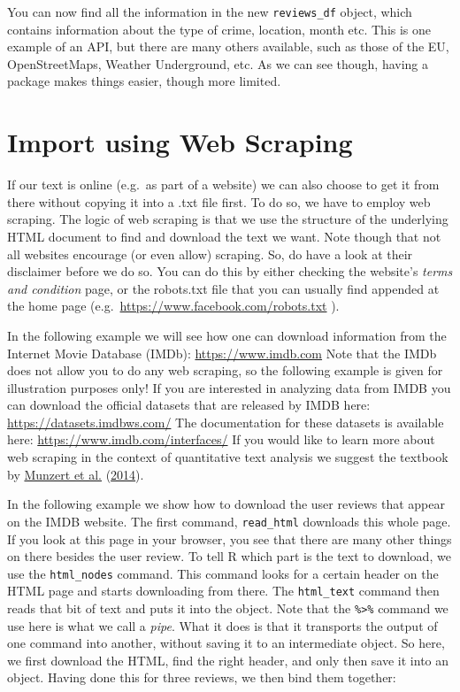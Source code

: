 \documentclass[
]{book}
\begin{document}
You can now find all the information in the new \texttt{reviews\_df} object, which contains information about the type of crime, location, month etc. This is one example of an API, but there are many others available, such as those of the EU, OpenStreetMaps, Weather Underground, etc. As we can see though, having a package makes things easier, though more limited.

\hypertarget{import-using-web-scraping}{%
\section{Import using Web Scraping}\label{import-using-web-scraping}}

If our text is online (e.g.~as part of a website) we can also choose to get it from there without copying it into a .txt file first. To do so, we have to employ web scraping. The logic of web scraping is that we use the structure of the underlying HTML document to find and download the text we want. Note though that not all websites encourage (or even allow) scraping. So, do have a look at their disclaimer before we do so. You can do this by either checking the website's \emph{terms and condition} page, or the robots.txt file that you can usually find appended at the home page (e.g.~\url{https://www.facebook.com/robots.txt} ).

In the following example we will see how one can download information from the Internet Movie Database (IMDb): \url{https://www.imdb.com} Note that the IMDb does not allow you to do any web scraping, so the following example is given for illustration purposes only! If you are interested in analyzing data from IMDB you can download the official datasets that are released by IMDB here: \url{https://datasets.imdbws.com/} The documentation for these datasets is available here: \url{https://www.imdb.com/interfaces/} If you would like to learn more about web scraping in the context of quantitative text analysis we suggest the textbook by \protect\hyperlink{ref-Munzert2014}{Munzert et al.} (\protect\hyperlink{ref-Munzert2014}{2014}).

In the following example we show how to download the user reviews that appear on the IMDB website. The first command, \texttt{read\_html} downloads this whole page. If you look at this page in your browser, you see that there are many other things on there besides the user review. To tell R which part is the text to download, we use the \texttt{html\_nodes} command. This command looks for a certain header on the HTML page and starts downloading from there. The \texttt{html\_text} command then reads that bit of text and puts it into the object. Note that the \texttt{\%\textgreater{}\%} command we use here is what we call a \emph{pipe}. What it does is that it transports the output of one command into another, without saving it to an intermediate object. So here, we first download the HTML, find the right header, and only then save it into an object. Having done this for three reviews, we then bind them together:
\end{document}
